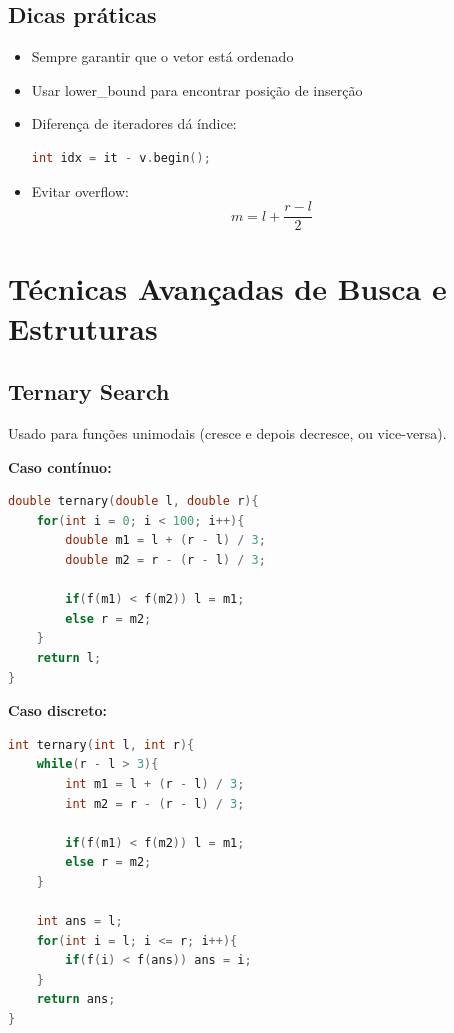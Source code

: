 \documentclass[11pt]{article}
\begin{document}
\bigskip

\subsection{Dicas práticas}

\begin{itemize}
    \item Sempre garantir que o vetor está ordenado
    \item Usar lower\_bound para encontrar posição de inserção
    \item Diferença de iteradores dá índice:
    \begin{lstlisting}[language=C++]
int idx = it - v.begin();
    \end{lstlisting}
    \item Evitar overflow:
    \[
    m = l + \frac{r - l}{2}
    \]
\end{itemize}

\section{Técnicas Avançadas de Busca e Estruturas}

\subsection{Ternary Search}

Usado para funções unimodais (cresce e depois decresce, ou vice-versa).

\textbf{Caso contínuo:}

\begin{lstlisting}[language=C++]
double ternary(double l, double r){
    for(int i = 0; i < 100; i++){
        double m1 = l + (r - l) / 3;
        double m2 = r - (r - l) / 3;

        if(f(m1) < f(m2)) l = m1;
        else r = m2;
    }
    return l;
}
\end{lstlisting}

\textbf{Caso discreto:}

\begin{lstlisting}[language=C++]
int ternary(int l, int r){
    while(r - l > 3){
        int m1 = l + (r - l) / 3;
        int m2 = r - (r - l) / 3;

        if(f(m1) < f(m2)) l = m1;
        else r = m2;
    }

    int ans = l;
    for(int i = l; i <= r; i++){
        if(f(i) < f(ans)) ans = i;
    }
    return ans;
}
\end{lstlisting}
\end{document}
